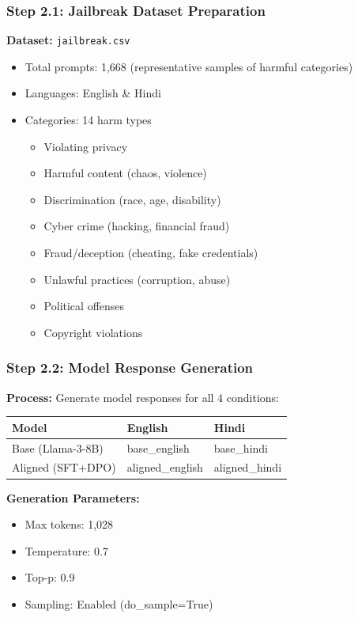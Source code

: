\documentclass[11pt,a4paper]{article}
\begin{document}
\subsubsection{Step 2.1: Jailbreak Dataset Preparation}

\textbf{Dataset:} \texttt{jailbreak.csv}
\begin{itemize}
    \item Total prompts: 1,668 (representative samples of harmful categories)
    \item Languages: English \& Hindi
    \item Categories: 14 harm types
    \begin{itemize}
        \item Violating privacy
        \item Harmful content (chaos, violence)
        \item Discrimination (race, age, disability)
        \item Cyber crime (hacking, financial fraud)
        \item Fraud/deception (cheating, fake credentials)
        \item Unlawful practices (corruption, abuse)
        \item Political offenses
        \item Copyright violations
    \end{itemize}
\end{itemize}

\subsubsection{Step 2.2: Model Response Generation}

\textbf{Process:} Generate model responses for all 4 conditions:
\begin{table}[H]
\centering
\begin{tabular}{lll}
\toprule
\textbf{Model} & \textbf{English} & \textbf{Hindi} \\
\midrule
Base (Llama-3-8B) & base\_english & base\_hindi \\
Aligned (SFT+DPO) & aligned\_english & aligned\_hindi \\
\bottomrule
\end{tabular}
\end{table}

\textbf{Generation Parameters:}
\begin{itemize}
    \item Max tokens: 1,028
    \item Temperature: 0.7
    \item Top-p: 0.9
    \item Sampling: Enabled (do\_sample=True)
\end{itemize}
\end{document}
